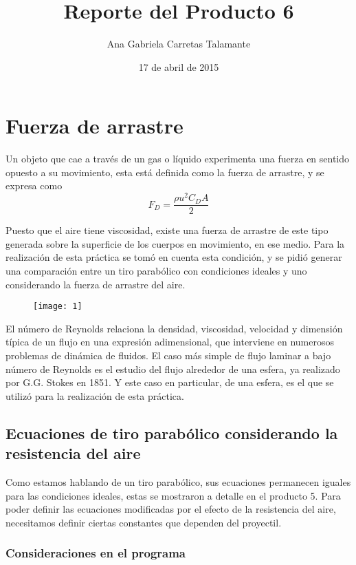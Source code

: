 \documentclass[a4paper]{article}
\title{Reporte del Producto 6}
\author{Ana Gabriela Carretas Talamante}
\date{17 de abril de 2015}
\begin{document}
\maketitle
\section{Fuerza de arrastre}
Un objeto que cae a través de un gas o líquido experimenta una fuerza en sentido opuesto a su movimiento, esta está definida como la fuerza de arrastre, y se expresa como 
\begin{equation} 
\label{1}
F_D = \frac{\rho u^2 C_D A}{2}
\end{equation}

Puesto que el aire tiene viscosidad, existe una fuerza de arrastre de este tipo generada sobre la superficie de los cuerpos en movimiento, en ese medio. Para la realización de esta práctica se tomó en cuenta esta condición, y se pidió generar una comparación entre un tiro parabólico con condiciones ideales y uno considerando la fuerza de arrastre del aire.
\begin{figure}[H]
    \centering
    \texttt{[image: 1]}
  \end{figure} 

El número de Reynolds relaciona la densidad, viscosidad, velocidad y dimensión típica de un flujo en una expresión adimensional, que interviene en numerosos problemas de dinámica de fluidos. El caso más simple de flujo laminar a bajo número de Reynolds es el estudio del flujo alrededor de una esfera, ya realizado por G.G. Stokes en 1851. Y este caso en particular, de una esfera, es el que se utilizó para la realización de esta práctica.

  
\subsection{Ecuaciones de tiro parabólico considerando la resistencia del aire}
\label{uno}

Como estamos hablando de un tiro parabólico, sus ecuaciones permanecen iguales para las condiciones ideales, estas se mostraron a detalle en el producto 5. Para poder definir las ecuaciones modificadas por el efecto de la resistencia del aire, necesitamos definir ciertas constantes que dependen del proyectil. \\

\subsubsection{Consideraciones en el programa}
\end{document}

